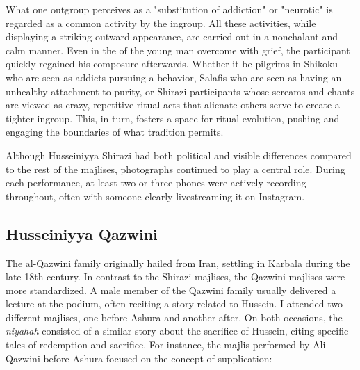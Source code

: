 What one outgroup perceives as a "substitution of addiction" or  "neurotic" is regarded as a common activity by the ingroup. All these activities, while displaying a striking outward appearance, are carried out in a nonchalant and calm manner. Even in the of the young man overcome with grief, the participant quickly regained his composure afterwards. Whether it be pilgrims in Shikoku who are seen as addicts pursuing a behavior, Salafis who are seen as having an unhealthy attachment to purity, or Shirazi participants whose screams and chants are viewed as crazy, repetitive ritual acts that alienate others serve to create a tighter ingroup. This, in turn, fosters a space for ritual evolution, pushing and engaging the boundaries of what tradition permits.

Although Husseiniyya Shirazi had both political and visible differences compared to the rest of the majlises, photographs continued to play a central role. During each performance, at least two or three phones were actively recording throughout, often with someone clearly livestreaming it on Instagram.

\subsection{Husseiniyya Qazwini}
The al-Qazwini family originally hailed from Iran, settling in Karbala during the late 18th century. In contrast to the Shirazi majlises, the Qazwini majlises were more standardized. A male member of the Qazwini family usually delivered a lecture at the podium, often reciting a story related to Hussein. I attended two different majlises, one before Ashura and another after. On both occasions, the \emph{niyahah} consisted of a similar story about the sacrifice of Hussein, citing specific tales of redemption and sacrifice. For instance, the majlis performed by Ali Qazwini before Ashura focused on the concept of supplication:


